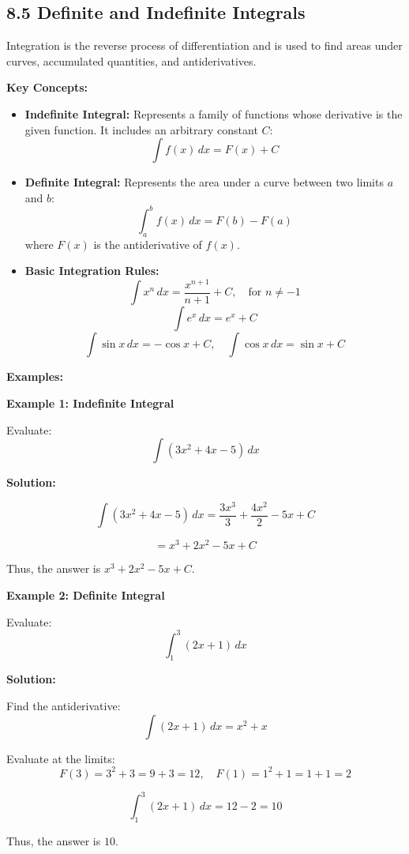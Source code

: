 
\subsection*{8.5 Definite and Indefinite Integrals}

Integration is the reverse process of differentiation and is used to find areas under curves, accumulated quantities, and antiderivatives.

\textbf{Key Concepts:}
\begin{itemize}
	\item \textbf{Indefinite Integral:} Represents a family of functions whose derivative is the given function. It includes an arbitrary constant \(C\):
	\[
	\int f(x) \,dx = F(x) + C
	\]
	\item \textbf{Definite Integral:} Represents the area under a curve between two limits \(a\) and \(b\):
	\[
	\int_a^b f(x) \,dx = F(b) - F(a)
	\]
	where \( F(x) \) is the antiderivative of \( f(x) \).
	\item \textbf{Basic Integration Rules:}
	\[
	\int x^n \,dx = \frac{x^{n+1}}{n+1} + C, \quad \text{for } n \neq -1
	\]
	\[
	\int e^x \,dx = e^x + C
	\]
	\[
	\int \sin x \,dx = -\cos x + C, \quad \int \cos x \,dx = \sin x + C
	\]
\end{itemize}

\textbf{Examples:}

\begin{flushleft}
	\textbf{Example 1: Indefinite Integral}
	
	Evaluate:
	\[
	\int (3x^2 + 4x - 5) \,dx
	\]
	
	\textbf{Solution:} \vspace{0.2cm}
	
	\[
	\int (3x^2 + 4x - 5) \,dx = \frac{3x^3}{3} + \frac{4x^2}{2} - 5x + C
	\]
	
	\[
	= x^3 + 2x^2 - 5x + C
	\]
	
	Thus, the answer is \( \boxed{x^3 + 2x^2 - 5x + C} \).
\end{flushleft}

\begin{flushleft}
	\textbf{Example 2: Definite Integral}
	
	Evaluate:
	\[
	\int_1^3 (2x + 1) \,dx
	\]
	
	\textbf{Solution:} \vspace{0.2cm}
	
	Find the antiderivative:
	\[
	\int (2x + 1) \,dx = x^2 + x
	\]
	
	Evaluate at the limits:
	\[
	F(3) = 3^2 + 3 = 9 + 3 = 12, \quad F(1) = 1^2 + 1 = 1 + 1 = 2
	\]
	
	\[
	\int_1^3 (2x + 1) \,dx = 12 - 2 = 10
	\]
	
	Thus, the answer is \( \boxed{10} \).
\end{flushleft}

